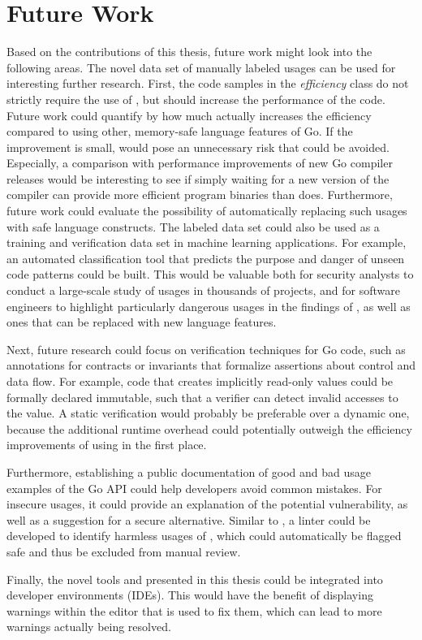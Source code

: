 
\chapter{Future Work}\label{ch:future-work}

Based on the contributions of this thesis, future work might look into the following areas.
The novel data set of manually labeled \unsafe{} usages can be used for interesting further research.
First, the code samples in the \textit{efficiency} class do not strictly require the use of \unsafe{}, but should
increase the performance of the code.
Future work could quantify by how much \unsafe{} actually increases the efficiency compared to using other, memory-safe
language features of Go.
If the improvement is small, \unsafe{} would pose an unnecessary risk that could be avoided.
Especially, a comparison with performance improvements of new Go compiler releases would be interesting to see if
simply waiting for a new version of the compiler can provide more efficient program binaries than \unsafe{} does.
Furthermore, future work could evaluate the possibility of automatically replacing such \unsafe{} usages with safe
language constructs.
The labeled data set could also be used as a training and verification data set in machine learning applications.
For example, an automated classification tool that predicts the purpose and danger of unseen \unsafe{} code patterns
could be built.
This would be valuable both for security analysts to conduct a large-scale study of \unsafe{} usages in thousands of
projects, and for software engineers to highlight particularly dangerous usages in the findings of \toolGeiger{}, as
well as ones that can be replaced with new language features.

Next, future research could focus on verification techniques for \unsafe{} Go code, such as annotations for
contracts or invariants that formalize assertions about control and data flow.
For example, \unsafe{} code that creates implicitly read-only values could be formally declared immutable, such that
a verifier can detect invalid accesses to the value.
A static verification would probably be preferable over a dynamic one, because the additional runtime overhead could
potentially outweigh the efficiency improvements of using \unsafe{} in the first place.

Furthermore, establishing a public documentation of good and bad usage examples of the Go \unsafe{} \acrshort{API} could
help developers avoid common mistakes.
For insecure usages, it could provide an explanation of the potential vulnerability, as well as a suggestion for a
secure alternative.
Similar to \toolSafer{}, a linter could be developed to identify harmless usages of \unsafe{}, which could automatically
be flagged safe and thus be excluded from manual review.

Finally, the novel tools \toolGeiger{} and \toolSafer{} presented in this thesis could be integrated into developer
environments (\acrshort{IDE}s).
This would have the benefit of displaying warnings within the editor that is used to fix them, which can lead to more
warnings actually being resolved.
